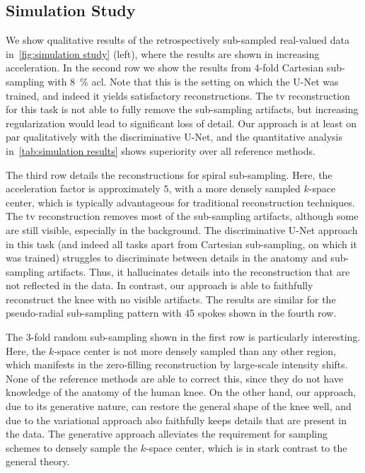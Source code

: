 \documentclass[twocolumn]{article}
\begin{document}
\subsection{Simulation Study}
We show qualitative results of the retrospectively sub-sampled real-valued data in~\cref{fig:simulation study} (left), where the results are shown in increasing acceleration.
In the second row we show the results from \num{4}-fold Cartesian sub-sampling with \qty{8}{\percent} \gls{acl}.
Note that this is the setting on which the U-Net was trained, and indeed it yields satisfactory reconstructions.
The \gls{tv} reconstruction for this task is not able to fully remove the sub-sampling artifacts, but increasing regularization would lead to significant loss of detail.
Our approach is at least on par qualitatively with the discriminative U-Net, and the quantitative analysis in~\cref{tab:simulation results} shows superiority over all reference methods.

The third row details the reconstructions for spiral sub-sampling.
Here, the acceleration factor is approximately \( \num{5} \), with a more densely sampled \( k \)-space center, which is typically advantageous for traditional reconstruction techniques.
The \gls{tv} reconstruction removes most of the sub-sampling artifacts, although some are still visible, especially in the background.
The discriminative U-Net approach in this task (and indeed all tasks apart from Cartesian sub-sampling, on which it was trained) struggles to discriminate between details in the anatomy and sub-sampling artifacts.
Thus, it hallucinates details into the reconstruction that are not reflected in the data.
In contrast, our approach is able to faithfully reconstruct the knee with no visible artifacts.
The results are similar for the pseudo-radial sub-sampling pattern with \num{45} spokes shown in the fourth row.

The \num{3}-fold random sub-sampling shown in the first row is particularly interesting.
Here, the \( k \)-space center is not more densely sampled than any other region, which manifests in the zero-filling reconstruction by large-scale intensity shifts.
None of the reference methods are able to correct this, since they do not have knowledge of the anatomy of the human knee.
On the other hand, our approach, due to its generative nature, can restore the general shape of the knee well, and due to the variational approach also faithfully keeps details that are present in the data.
The generative approach alleviates the requirement for sampling schemes to densely sample the \( k \)-space center, which is in stark contrast to the general theory.%
\end{document}
